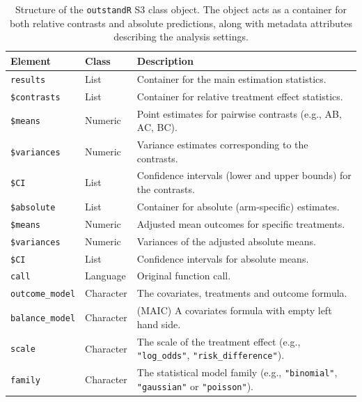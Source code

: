 \documentclass[article]{jss}
\begin{document}
\begin{table}[ht!]
\centering
\caption{Structure of the \texttt{outstandR} S3 class object. The object acts as a container for both relative contrasts and absolute predictions, along with metadata attributes describing the analysis settings.}
\label{tab:s3_structure}
\begin{tabular}{l l p{9.5cm}}
\toprule
\textbf{Element} & \textbf{Class} & \textbf{Description} \\
\midrule
\texttt{results} & List & Container for the main estimation statistics. \\
\hspace{3mm} \texttt{\$contrasts} & List & Container for relative treatment effect statistics. \\
\hspace{6mm} \texttt{\$means} & Numeric & Point estimates for pairwise contrasts (e.g., AB, AC, BC). \\
\hspace{6mm} \texttt{\$variances} & Numeric & Variance estimates corresponding to the contrasts. \\
\hspace{6mm} \texttt{\$CI} & List & Confidence intervals (lower and upper bounds) for the contrasts. \\
\hspace{3mm} \texttt{\$absolute} & List & Container for absolute (arm-specific) estimates. \\
\hspace{6mm} \texttt{\$means} & Numeric & Adjusted mean outcomes for specific treatments. \\
\hspace{6mm} \texttt{\$variances} & Numeric & Variances of the adjusted absolute means. \\
\hspace{6mm} \texttt{\$CI} & List & Confidence intervals for absolute means. \\
\addlinespace
\texttt{call} & Language & Original function call. \\
\texttt{outcome\_model} & Character & The covariates, treatments and outcome formula. \\
\texttt{balance\_model} & Character & (MAIC) A covariates formula with empty left hand side. \\
\texttt{scale} & Character & The scale of the treatment effect (e.g., \texttt{"log\_odds"}, \texttt{"risk\_difference"}). \\
\texttt{family} & Character & The statistical model family (e.g., \texttt{"binomial"}, \texttt{"gaussian"} or \texttt{"poisson"}). \\

\end{tabular}
\end{table}
\end{document}
